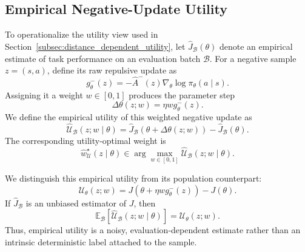 \documentclass{article}
\theoremstyle{plain}
\theoremstyle{definition}
\theoremstyle{remark}
\begin{document}
\subsection{Empirical Negative-Update Utility}
\label{app:negative_update_utility}

To operationalize the utility view used in
Section~\ref{subsec:distance_dependent_utility}, let
\(\widehat J_{\mathcal B}(\theta)\) denote an empirical estimate of task
performance on an evaluation batch \(\mathcal B\). For a negative sample
\(z=(s,a)\), define its raw repulsive update as
\begin{equation}
    g_\theta^-(z)
    =
    -\widehat A^-(z)
    \nabla_\theta \log \pi_\theta(a\mid s).
    \label{eq:raw_negative_update}
\end{equation}
Assigning it a weight \(w\in[0,1]\) produces the parameter step
\begin{equation}
    \Delta\theta(z;w)
    =
    \eta w g_\theta^-(z).
    \label{eq:weighted_negative_step}
\end{equation}
We define the empirical utility of this weighted negative update as
\begin{equation}
    \widehat{\mathcal U}_{\mathcal B}
    (z;w\mid\theta)
    =
    \widehat J_{\mathcal B}
    \!\left(
        \theta+\Delta\theta(z;w)
    \right)
    -
    \widehat J_{\mathcal B}(\theta).
    \label{eq:app_empirical_negative_update_utility}
\end{equation}
The corresponding utility-optimal weight is
\begin{equation}
    \widehat w_{\mathcal U}^{\star}(z\mid\theta)
    \in
    \arg\max_{w\in[0,1]}
    \widehat{\mathcal U}_{\mathcal B}(z;w\mid\theta).
    \label{eq:empirical_utility_optimal_weight}
\end{equation}

We distinguish this empirical utility from its population counterpart:
\begin{equation}
    \mathcal U_\theta(z;w)
    =
    J\!\left(
        \theta+\eta w g_\theta^-(z)
    \right)
    -
    J(\theta).
    \label{eq:population_negative_update_utility}
\end{equation}
If \(\widehat J_{\mathcal B}\) is an unbiased estimator of \(J\), then
\begin{equation}
    \mathbb E_{\mathcal B}
    \left[
        \widehat{\mathcal U}_{\mathcal B}(z;w\mid\theta)
    \right]
    =
    \mathcal U_\theta(z;w).
    \label{eq:empirical_utility_unbiased}
\end{equation}
Thus, empirical utility is a noisy, evaluation-dependent estimate rather
than an intrinsic deterministic label attached to the sample.
\end{document}
